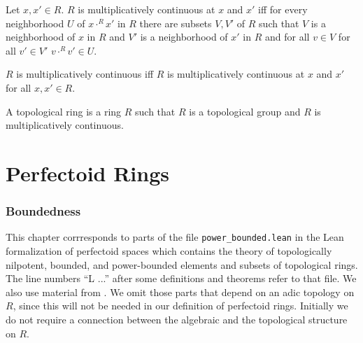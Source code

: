 \documentclass[english,11pt]{article}
\begin{document}
\begin{forthel}

\begin{definition}
Let $x,x' \in R$. $R$ is multiplicatively continuous at $x$ and $x'$ iff
for every neighborhood $U$ of $x \cdot^{R} x'$ in $R$
there are subsets $V,V'$ of $R$ such that 
$V$ is a neighborhood of $x$ in $R$ and $V'$ is a neighborhood
of $x'$ in $R$ and for all $v \in V$ for all $v' \in V'$ 
$v \cdot^{R} v' \in U$.
\end{definition}

\begin{definition}
$R$ is multiplicatively continuous iff $R$ is multiplicatively continuous at
$x$ and $x'$ for all $x,x' \in R$.
\end{definition}

\begin{definition}[title = Topological ring]
A topological ring is a ring $R$ such that $R$ is a topological group
and $R$ is multiplicatively continuous.
\end{definition}

\end{forthel}

\part{Perfectoid Rings}

\section{Boundedness}

This chapter corrresponds to parts of the file \verb+power_bounded.lean+
in the Lean formalization of perfectoid spaces \cite{Lean} which contains
the theory of topologically nilpotent, bounded, and power-bounded
elements and subsets of topological rings. The line numbers ``L ...'' after
some definitions and theorems refer to that file.
We also use material from \cite{Wedhhorn2019}.
We omit those parts that depend on an adic topology on $R$, since this
will not be needed in our definition of perfectoid rings.
Initially we do not require a connection between the
algebraic and the topological structure on $R$.
\end{document}
